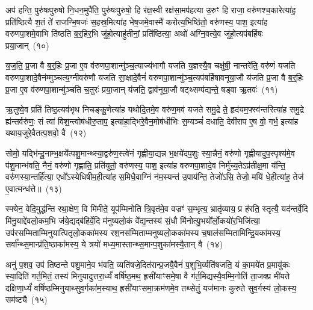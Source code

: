 अप॑ हन्ति॒ पुरु॑षःपुरुषो नि॒धन॒मुपै॑ति॒ पुरु॑षःपुरुषो॒ हि र॑क्ष॒स्वी रक्ष॑सा॒मप॑हत्या उ॒रुꣳ हि राजा॒ वरु॑णश्च॒कारेत्या॑ह॒ प्रति॑ष्ठित्यै श॒तं ते॑ राजन्भि॒षजः॑ स॒हस्र॒मित्या॑ह भेष॒जमे॒वास्मै॑ करोत्य॒भिष्ठि॑तो॒ वरु॑णस्य॒ पाश॒ इत्या॑ह वरुणपा॒शमे॒वाभि ति॑ष्ठति ब॒र्॒\mbox{}हिर॒भि जु॑हो॒त्याहु॑तीनां॒ प्रति॑ष्ठित्या॒ अथो॑ अग्नि॒वत्ये॒व जु॑हो॒त्यप॑बर्\mbox{}हिषः प्रया॒जान्~(१०)

य॒ज॒ति॒ प्र॒जा वै ब॒र्॒\mbox{}हिः प्र॒जा ए॒व व॑रुणपा॒शान्मु॑ञ्च॒त्याज्य॑भागौ यजति य॒ज्ञस्यै॒व चक्षु॑षी॒ नान्तरे॑ति॒ वरु॑णं यजति वरुणपा॒शादे॒वैन॑म्मुञ्चत्य॒ग्नीवरु॑णौ यजति सा॒क्षादे॒वैनं॑ वरुणपा॒शान्मु॑ञ्च॒त्यप॑बर्\mbox{}हिषावनूया॒जौ य॑जति प्र॒जा वै ब॒र्॒\mbox{}हिः प्र॒जा ए॒व व॑रुणपा॒शान्मु॑ञ्चति च॒तुरः॑ प्रया॒जान् य॑जति॒ द्वाव॑नूया॒जौ षट्थ्सम्प॑द्यन्ते॒ षड्वा ऋ॒तवः॑~(११)

ऋ॒तुष्वे॒व प्रति॑ तिष्ठ॒त्यव॑भृथ निचङ्कु॒णेत्या॑ह यथोदि॒तमे॒व वरु॑ण॒मव॑ यजते समु॒द्रे ते॒ हृद॑यम॒फ्स्व॑न्तरित्या॑ह समु॒द्रे ह्य॑न्तर्वरु॑णः॒ सं त्वा॑ विश॒न्त्वोष॑धीरु॒ताप॒ इत्या॑हा॒द्भिरे॒वैन॒मोष॑धीभिः स॒म्यञ्चं॑ दधाति॒ देवी॑राप ए॒ष वो॒ गर्भ॒ इत्या॑ह यथाय॒जुरे॒वैतत्प॒शवो॒ वै~(१२)

सोमो॒ यद्भि॑न्दू॒नाम्भ॒क्षये᳚त्पशु॒मान्थ्स्या॒द्वरु॑ण॒स्त्वे॑नं गृह्णीया॒द्यन्न भ॒क्षये॑दप॒शुः स्या॒न्नैनं॒ वरु॑णो गृह्णीयादुप॒स्पृश्य॑मे॒व प॑शु॒मान्भ॑वति॒ नैनं॒ वरु॑णो गृह्णाति॒ प्रति॑युतो॒ वरु॑णस्य॒ पाश॒ इत्या॑ह वरुणपा॒शादे॒व निर्मु॑च्य॒ते\-ऽप्र॑तीक्ष॒मा य॑न्ति॒ वरु॑णस्या॒न्तर्\mbox{}हि॑त्या॒ एधो᳚\-ऽस्येधिषीम॒हीत्या॑ह स॒मिधै॒वाग्निं न॑म॒स्यन्त॑ उ॒पाय॑न्ति॒ तेजो॑\-ऽसि॒ तेजो॒ मयि॑ धे॒हीत्या॑ह॒ तेज॑ ए॒वात्मन्ध॑त्ते॥~(१३)

{\anuvakamend[{रक्षाꣳ॑सि प्रया॒जानृ॒तवो॒ वै न॑म॒स्यन्तो॒ द्वाद॑श च}]}%

स्फ्येन॒ वेदि॒मुद्ध॑न्ति रथा॒क्षेण॒ वि मि॑मीते॒ यूप॑म्मिनोति त्रि॒वृत॑मे॒व वज्रꣳ॑ स॒म्भृत्य॒ भ्रातृ॑व्याय॒ प्र ह॑रति॒ स्तृत्यै॒ यद॑न्तर्वे॒दि मि॑नु॒याद्दे॑वलो॒कम॒भि ज॑ये॒द्यद्ब॑हिर्वे॒दि म॑नुष्यलो॒कं वे᳚द्य॒न्तस्य॑ सं॒धौ मि॑नोत्यु॒भयो᳚र्लो॒कयो॑र॒भिजि॑त्या॒ उप॑रसम्मिताम्मिनुयात्पितृलो॒कका॑मस्य रश॒नस॑म्मिताम्मनुष्यलो॒कका॑मस्य च॒षाल॑सम्मितामिन्द्रि॒यका॑मस्य॒ सर्वा᳚न्थ्स॒मान्प्र॑ति॒ष्ठाका॑मस्य॒ ये त्रयो॑ मध्य॒मास्तान्थ्स॒मान्प॒शुका॑मस्यै॒तान् वै~(१४)

अनु॑ प॒शव॒ उप॑ तिष्ठन्ते पशु॒माने॒व भ॑वति॒ व्यति॑षजे॒दित॑रान्प्र॒जयै॒वैनं॑ प॒शुभि॒र्व्यति॑षजति॒ यं का॒मये॑त प्र॒मायु॑कः स्या॒दिति॑ गर्त॒मितं॒ तस्य॑ मिनुयादुत्तरा॒र्ध्यं॑ वर्\mbox{}षि॑ष्ठ॒मथ॒ ह्रसी॑याꣳसमे॒षा वै ग॑र्त॒मिद्यस्यै॒वम्मि॒नोति॑ ता॒जक्प्र मी॑यते दक्षिणा॒र्ध्यं॑ वर्\mbox{}षि॑ष्ठम्मिनुयाथ्सुव॒र्गका॑म॒स्याथ॒ ह्रसी॑याꣳसमा॒क्रम॑णमे॒व तथ्सेतुं॒ यज॑मानः कुरुते सुव॒र्गस्य॑ लो॒कस्य॒ सम॑ष्ट्यै~(१५)

